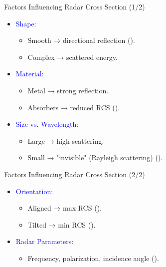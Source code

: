 \begin{frame}{Factors Influencing Radar Cross Section (1/2)}
    \small
    \begin{itemize}
        \item \textcolor{blue}{Shape:}
            \begin{itemize}
                \item Smooth → directional reflection (\cite[p. 47]{knott2004radar}).
                \item Complex → scattered energy.
            \end{itemize}
        \item \textcolor{blue}{Material:}
            \begin{itemize}
                \item Metal → strong reflection.
                \item Absorbers → reduced RCS (\cite[Section 3.2]{knott2004radar}).
            \end{itemize}
        \item \textcolor{blue}{Size vs. Wavelength:}
            \begin{itemize}
                \item Large → high scattering.
                \item Small → "invisible" (Rayleigh scattering) (\cite[p. 188]{kolosov1987}).
            \end{itemize}
    \end{itemize}
\end{frame}

\begin{frame}{Factors Influencing Radar Cross Section (2/2)}
    \small
    \begin{itemize}
        \item \textcolor{blue}{Orientation:}
            \begin{itemize}
                \item Aligned → max RCS (\cite[Eq. 2.1]{knott2004radar}).
                \item Tilted → min RCS (\cite[p. 22]{skolnik1962introduction}).
            \end{itemize}
        \item \textcolor{blue}{Radar Parameters:}
            \begin{itemize}
                \item Frequency, polarization, incidence angle (\cite[p. 45]{cite-trcs}).
            \end{itemize}
    \end{itemize}
\end{frame}

